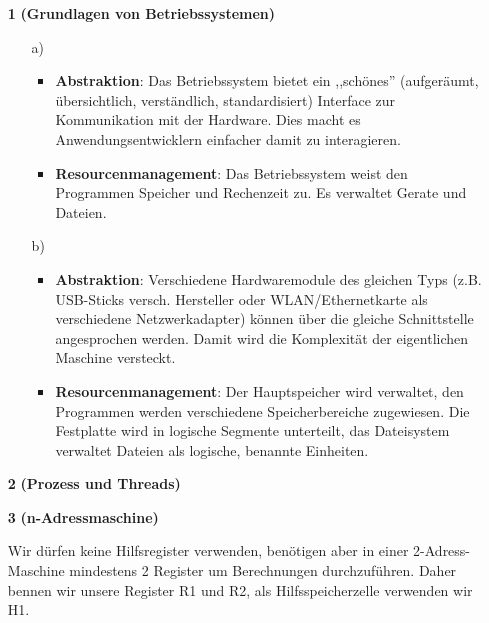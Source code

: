 \documentclass[a4paper,11pt]{article}
\author{\authorinfo}
\title{\titleinfo}
\date{\today}
\begin{document}
\maketitle


\begin{enumerate}
\item[\textbf{1}]
    \textbf{(Grundlagen von Betriebssystemen)}
    \begin{enumerate} 
        \item[a)]
        \begin{itemize}
            \item \textbf{Abstraktion}: Das Betriebssystem bietet ein ,,schönes'' (aufgeräumt, übersichtlich, verständlich, standardisiert) Interface zur Kommunikation mit der Hardware. Dies macht es Anwendungsentwicklern einfacher damit zu interagieren.
            \item \textbf{Resourcenmanagement}: Das Betriebssystem weist den Programmen Speicher und Rechenzeit zu. Es verwaltet Gerate und Dateien. 

        \end{itemize}
        \item[b)]
        \begin{itemize}
            \item \textbf{Abstraktion}: Verschiedene Hardwaremodule des gleichen Typs (z.B. USB-Sticks versch. Hersteller oder WLAN/Ethernetkarte als verschiedene Netzwerkadapter) können über die gleiche Schnittstelle angesprochen werden. Damit wird die Komplexität der eigentlichen Maschine versteckt.  
            \item \textbf{Resourcenmanagement}: Der Hauptspeicher wird verwaltet, den Programmen werden verschiedene Speicherbereiche zugewiesen. Die Festplatte wird in logische Segmente unterteilt, das Dateisystem verwaltet Dateien als logische, benannte Einheiten.
        \end{itemize}   
    \end{enumerate}
\item[\textbf{2}]
    \textbf{(Prozess und Threads)}


\item[\textbf{3}]
    \textbf{(n-Adressmaschine)}

    Wir dürfen keine Hilfsregister verwenden, benötigen aber in einer 2-Adress-Maschine mindestens 2 Register um Berechnungen durchzuführen. Daher bennen wir unsere Register R1 und R2, als Hilfsspeicherzelle verwenden wir H1.


\end{enumerate}
\end{document}
